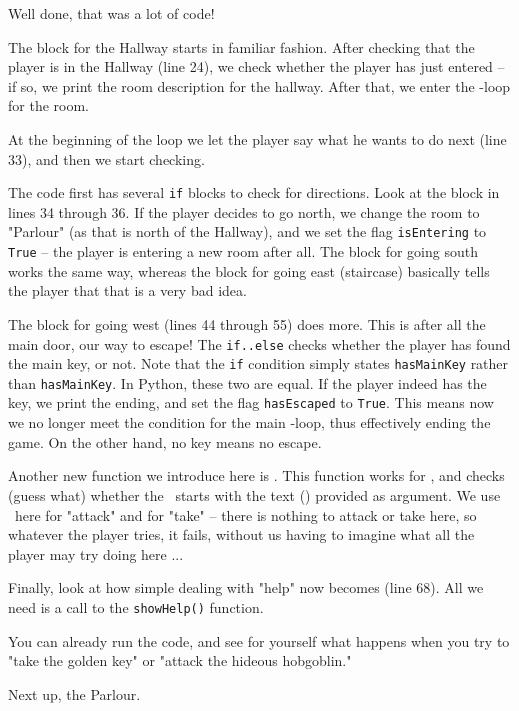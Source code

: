 Well done, that was a lot of code! 

The block for the Hallway starts in familiar fashion. After checking that the player is in the Hallway (line 24), we check whether the player has just entered -- if so, we print the room description for the hallway. After that, we enter the \whileloop-loop for the room. 

At the beginning of the loop we let the player say what he wants to do next (line 33), and then we start checking. 

The code first has several \texttt{if} blocks to check for directions. Look at the block in lines 34 through 36. If the player decides to go north, we change the room to "Parlour" (as that is north of the Hallway), and we set the flag \texttt{isEntering} to \texttt{True} -- the player is entering a new room after all. The block for going south works the same way, whereas the block for going east (staircase) basically tells the player that that is a very bad idea. 

The block for going west (lines 44 through 55) does more. This is after all the main door, our way to escape! The \texttt{if..else} checks whether the player has found the main key, or not. Note that the \texttt{if} condition simply states \texttt{hasMainKey} rather than \texttt{hasMainKey}. In Python, these two are equal. If the player indeed has the key, we print the ending, and set the flag \texttt{hasEscaped} to \texttt{True}. This means now we no longer meet the condition for the main \whileloop-loop, thus effectively ending the game. On the other hand, no key means no escape. 

Another new function we introduce here is \startswith. This function works for , and checks (guess what) whether the \strvar\ starts with the text (\strvar) provided as argument. We use \startswith\ here for "attack" and for "take" -- there is nothing to attack or take here, so whatever the player tries, it fails, without us having to imagine what all the player may try doing here ... 

Finally, look at how simple dealing with "help" now becomes (line 68). All we need is a call to the \texttt{showHelp()} function. 

\begin{Exe}
You can already run the code, and see for yourself what happens when you try to "take the golden key" or "attack the hideous hobgoblin." \expend
\end{Exe}

\noindent{}Next up, the Parlour. 
 
